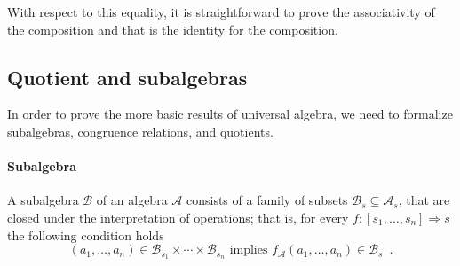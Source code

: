 \noindent With respect to this equality, it is straightforward to
prove the associativity of the composition
\AgdaUnderscore{}\AgdaUnderscore{} and
that  is the identity for the composition.


\subsection{Quotient and subalgebras}
In order to prove the more basic results of universal algebra, we need
to formalize subalgebras, congruence relations, and quotients.

\paragraph*{Subalgebra}

A subalgebra $\mathcal{B}$ of an algebra $\mathcal{A}$ consists of a
family of subsets $\mathcal{B}_s \subseteq \mathcal{A}_s$, that are
closed under the interpretation of operations; that is, for every
$ f : [s_1, \ldots,s_n] \Rightarrow s$ the following condition holds
\begin{equation}
(a_1,\ldots,a_n) \in \mathcal{B}_{s_1} \times \cdots \times\mathcal{B}_{s_n}   \text{ implies }
  f_\mathcal{A}(a_1,\ldots,a_n) \in \mathcal{B}_{s} \enspace .
 \label{eq:opclosed}
\end{equation}


